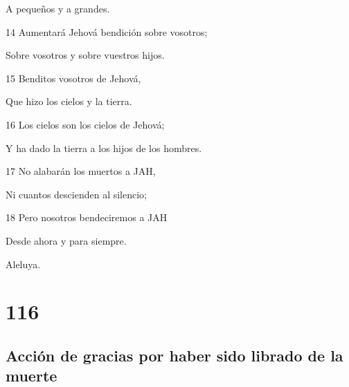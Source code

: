 \par A pequeños y a grandes.
\par 14 Aumentará Jehová bendición sobre vosotros;
\par Sobre vosotros y sobre vuestros hijos.
\par 15 Benditos vosotros de Jehová,
\par Que hizo los cielos y la tierra.
\par 16 Los cielos son los cielos de Jehová;
\par Y ha dado la tierra a los hijos de los hombres.
\par 17 No alabarán los muertos a JAH,
\par Ni cuantos descienden al silencio;
\par 18 Pero nosotros bendeciremos a JAH
\par Desde ahora y para siempre.
\par Aleluya.

\chapter{116}

\section*{Acción de gracias por haber sido librado de la muerte}

